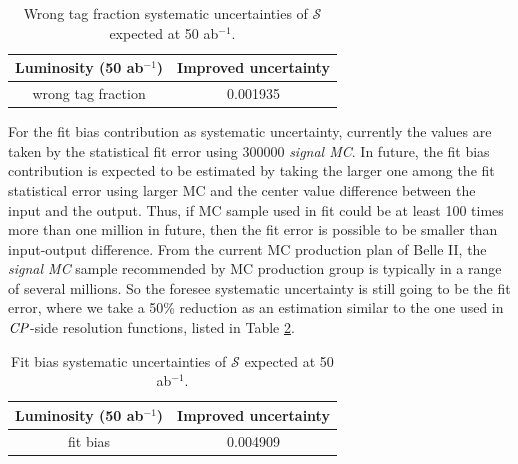 \begin{table}[htpb]
	\centering
	\caption{ Wrong tag fraction systematic uncertainties of $\mathcal{S}$ expected at 50 ab$^{-1}$.}
	\label{tab:wtag_50ab}
	\begin{tabular}{c| c}
		\hline
		Luminosity (50 ab$^{-1}$) & Improved uncertainty \\
		\hline
		wrong tag fraction &  0.001935\\
		\hline
	\end{tabular}
\end{table}

For the fit bias contribution as systematic uncertainty, currently the values are taken by the statistical fit error using 300000 \textit{signal MC}. In future, the fit bias contribution is expected to be estimated by taking the larger one among the fit statistical error using larger MC and the center value difference between the input and the output. Thus, if MC sample used in fit could be at least 100 times more than one million in future, then the fit error is possible to be smaller than input-output difference. From the current MC production plan of Belle II, the  \textit{signal MC} sample recommended by MC production group is typically in a range of several millions. So the foresee systematic uncertainty is still going to be the fit error, where we take a 50\% reduction as an estimation similar to the one used in $\it{CP}$-side resolution functions, listed in Table \ref{tab:fitbias_full}.

\begin{table}[htpb]
	\centering
	\caption{ Fit bias systematic uncertainties of $\mathcal{S}$ expected at 50 ab$^{-1}$.}
	\label{tab:fitbias_full}
	\begin{tabular}{c| c}
		\hline
		Luminosity (50 ab$^{-1}$) & Improved uncertainty \\
		\hline
		fit bias &  0.004909 \\
		\hline
	\end{tabular}
\end{table}

